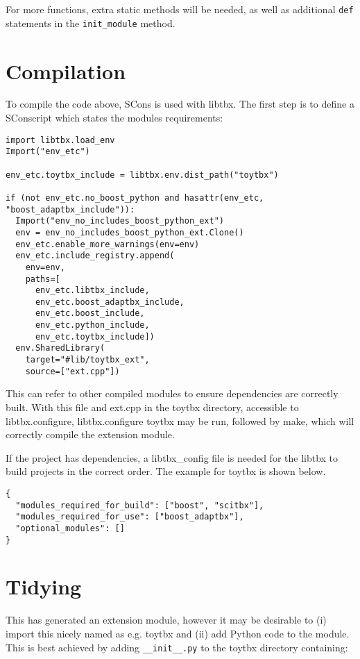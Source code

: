 \documentclass[a4paper, 11pt]{article}
\begin{document}
For more functions, extra static methods will be needed, as well as additional \verb|def| statements in the \verb|init_module| method.

\section{Compilation}

To compile the code above, SCons is used with libtbx. The first step is to define a SConscript which states the modules requirements:

{\small
\begin{verbatim}
import libtbx.load_env
Import("env_etc")

env_etc.toytbx_include = libtbx.env.dist_path("toytbx")

if (not env_etc.no_boost_python and hasattr(env_etc, "boost_adaptbx_include")):
  Import("env_no_includes_boost_python_ext")
  env = env_no_includes_boost_python_ext.Clone()
  env_etc.enable_more_warnings(env=env)
  env_etc.include_registry.append(
    env=env,
    paths=[
      env_etc.libtbx_include,
      env_etc.boost_adaptbx_include,
      env_etc.boost_include,
      env_etc.python_include,
      env_etc.toytbx_include])
  env.SharedLibrary(
    target="#lib/toytbx_ext",
    source=["ext.cpp"])
\end{verbatim}
}

This can refer to other compiled modules to ensure dependencies are correctly built. With this file and ext.cpp in the toytbx directory, accessible to libtbx.configure, libtbx.configure toytbx may be run, followed by make, which will correctly compile the extension module.

If the project has dependencies, a libtbx\_config file is needed for the libtbx to build projects in the correct order. The example for toytbx is shown below.

{\small
\begin{verbatim}
{
  "modules_required_for_build": ["boost", "scitbx"],
  "modules_required_for_use": ["boost_adaptbx"],
  "optional_modules": []
}
\end{verbatim}
}

\section{Tidying}

This has generated an extension module, however it may be desirable to (i) import this nicely named as e.g. toytbx and (ii) add Python code to the module. This is best achieved by adding \verb|__init__.py| to the toytbx directory containing:
\end{document}
